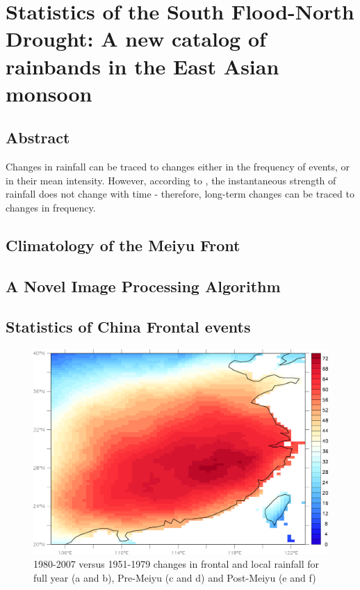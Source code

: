 \chapter{Statistics of the South Flood-North Drought: A new catalog of rainbands in the East Asian monsoon}


\section{Abstract}
Changes in rainfall can be traced to changes either in the frequency of events, or in their mean intensity. However, according to \cite{Biasutti2011}, the instantaneous strength of rainfall does not change with time - therefore, long-term changes can be traced to changes in frequency.

\section{Climatology of the Meiyu Front}

\section{A Novel Image Processing Algorithm}

\section{Statistics of China Frontal events}

\begin{figure}[htb]

\noindent\includegraphics[width=36pc]{Figures/A1_frontpct}
\caption{1980-2007 versus 1951-1979 changes in frontal and local rainfall for full year (a and b), Pre-Meiyu (c and d) and Post-Meiyu (e and f)}
\end{figure}


